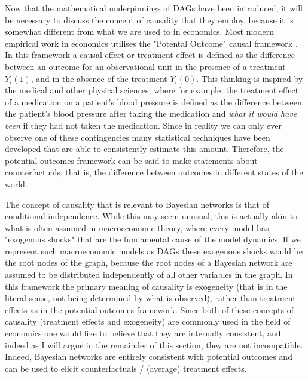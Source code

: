 \documentclass{article}
\begin{document}
Now that the mathematical underpinnings of DAGs have been introduced, it will be necessary to discuss the concept of causality that they employ, because it is somewhat different from what we are used to in economics. Most modern empirical work in economics utilises the "Potental Outcome" causal framework \parencite{holland1986statistics}. In this framework a causal effect or treatment effect is defined as the difference between an outcome for an observational unit in the presence of a treatment $Y_i(1)$, and in the absence of the treatment $Y_i(0)$. This thinking is inspired by the medical and other physical sciences, where for example, the treatment effect of a medication on a patient's blood pressure is defined as the difference between the patient's blood pressure after taking the medication and \textit{what it would have been} if they had not taken the medication. Since in reality we can only ever observe one of these contingencies many statistical techniques have been developed that are able to consistently estimate this amount. Therefore, the potential outcomes framework can be said to make statements about counterfactuals, that is, the difference between outcomes in different states of the world.

The concept of causality that is relevant to Bayesian networks is that of conditional independence. While this may seem unusual, this is actually akin to what is often assumed in macroeconomic theory, where every model has "exogenous shocks" that are the fundamental cause of the model dynamics. If we represent such macroeconomic models as DAGs these exogenous shocks would be the root nodes of the graph, because the root nodes of a Bayesian network are assumed to be distributed independently of all other variables in the graph. In this framework the primary meaning of causality is exogeneity (that is in the literal sense, not being determined by what is observed), rather than treatment effects as in the potential outcomes framework. Since both of these concepts of causality (treatment effects and exogeneity) are commonly used in the field of economics one would like to believe that they are internally consistent, and indeed as I will argue in the remainder of this section, they are not incompatible. Indeed, Bayesian networks are entirely consistent with potential outcomes and can be used to elicit counterfactuals / (average) treatment effects.
\end{document}
